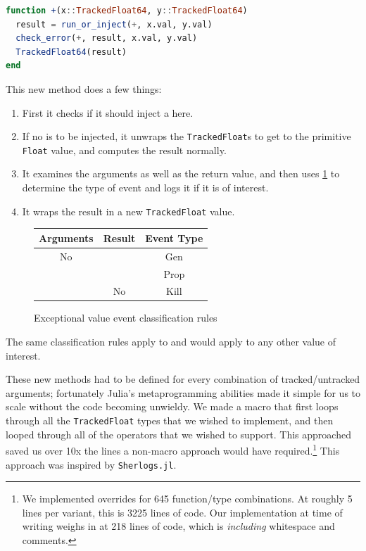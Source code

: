 \documentclass{juliacon}
\begin{document}
\begin{lstlisting}[language = Julia]
function +(x::TrackedFloat64, y::TrackedFloat64)
  result = run_or_inject(+, x.val, y.val)
  check_error(+, result, x.val, y.val)
  TrackedFloat64(result)
end
\end{lstlisting}

This new method does a few things:

\begin{enumerate}
\item First it checks if it should inject a \NaN{} here.
\item If no \NaN{} is to be injected, it unwraps the \texttt{TrackedFloat}s to get to the primitive \texttt{Float} value, and computes the result normally.
\item It examines the arguments as well as the return value, and then uses \cref{fig:lifetime-class} to determine the type of event and logs it if it is of interest.
\item It wraps the result in a new \texttt{TrackedFloat} value.
\end{enumerate}

\begin{figure}[h]
  \centering
  \begin{tabular}{ccc}
    Arguments & Result & Event Type \\
    \hline
    No \NaN{} & \NaN{} & Gen \\
    \NaN{} & \NaN{} & Prop \\
    \NaN{} & No \NaN{} & Kill \\
  \end{tabular}
  \label{fig:lifetime-class}
  \caption{Exceptional value event classification rules}
\end{figure}

The same classification rules apply to \Inf{} and would apply to any other value of interest.

These new methods had to be defined for every combination of tracked/untracked arguments;
fortunately Julia's metaprogramming abilities made it simple for us to scale without the code becoming unwieldy.
We made a macro that first loops through all the \texttt{TrackedFloat} types that we wished to implement, and then looped through all of the operators that we wished to support.
This approached saved us over 10x the lines a non-macro approach would have required.\footnote{We implemented overrides for 645 function/type combinations. At roughly 5 lines per variant, this is 3225 lines of code. Our implementation at time of writing weighs in at 218 lines of code, which is \emph{including} whitespace and comments.}
This approach was inspired by \texttt{Sherlogs.jl}.\cite{kMilanklSherlogsJl2021}
\end{document}
